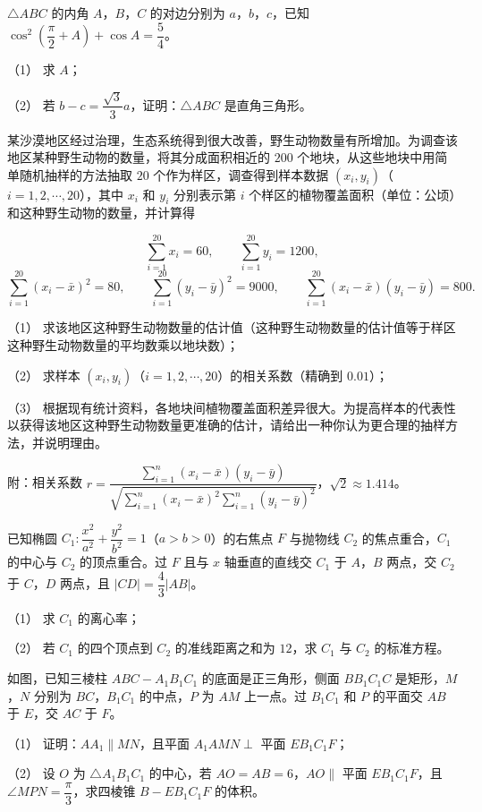 \begin{question}
$\triangle ABC$ 的内角 $A$，$B$，$C$ 的对边分别为 $a$，$b$，$c$，已知 $\cos^2\left(\dfrac\pi2+A\right)+\cos A=\dfrac54$。

（1） 求 $A$；

（2） 若 $b-c=\dfrac{\sqrt3}3a$，证明：$\triangle ABC$ 是直角三角形。

\end{question}
\begin{question}
某沙漠地区经过治理，生态系统得到很大改善，野生动物数量有所增加。为调查该地区某种野生动物的数量，将其分成面积相近的 $200$ 个地块，从这些地块中用简单随机抽样的方法抽取 $20$ 个作为样区，调查得到样本数据 $(x_i,y_i)$（$i=1,2,\cdots,20$），其中 $x_i$ 和 $y_i$ 分别表示第 $i$ 个样区的植物覆盖面积（单位：公顷）和这种野生动物的数量，并计算得

\nopagebreak[4]
\[\sum_{i=1}^{20}x_i=60,\qquad \sum_{i=1}^{20}y_i=1200,\]
\nopagebreak[4]
\[\sum_{i=1}^{20}(x_i-\bar x)^2=80,\qquad \sum_{i=1}^{20}(y_i-\bar y)^2=9000,\qquad \sum_{i=1}^{20}(x_i-\bar x)(y_i-\bar y)=800.\]

（1） 求该地区这种野生动物数量的估计值（这种野生动物数量的估计值等于样区这种野生动物数量的平均数乘以地块数）；

（2） 求样本 $(x_i,y_i)$（$i=1,2,\cdots,20$）的相关系数（精确到 $0.01$）；

（3） 根据现有统计资料，各地块间植物覆盖面积差异很大。为提高样本的代表性以获得该地区这种野生动物数量更准确的估计，请给出一种你认为更合理的抽样方法，并说明理由。

附：相关系数 $r=\dfrac{\sum\limits_{i=1}^n(x_i-\bar x)(y_i-\bar y)}{\sqrt{\sum\limits_{i=1}^n(x_i-\bar x)^2\sum\limits_{i=1}^n(y_i-\bar y)^2}}$，$\sqrt2\approx1.414$。

\end{question}
\begin{question}
已知椭圆 $C_1:\dfrac{x^2}{a^2}+\dfrac{y^2}{b^2}=1$（$a>b>0$）的右焦点 $F$ 与抛物线 $C_2$ 的焦点重合，$C_1$ 的中心与 $C_2$ 的顶点重合。过 $F$ 且与 $x$ 轴垂直的直线交 $C_1$ 于 $A$，$B$ 两点，交 $C_2$ 于 $C$，$D$ 两点，且 $|CD|=\dfrac43|AB|$。

（1） 求 $C_1$ 的离心率；

（2） 若 $C_1$ 的四个顶点到 $C_2$ 的准线距离之和为 $12$，求 $C_1$ 与 $C_2$ 的标准方程。

\Needspace{0.4\textheight}
\end{question}
\begin{question}
如图，已知三棱柱 $ABC-A_1B_1C_1$ 的底面是正三角形，侧面 $BB_1C_1C$ 是矩形，$M$，$N$ 分别为 $BC$，$B_1C_1$ 的中点，$P$ 为 $AM$ 上一点。过 $B_1C_1$ 和 $P$ 的平面交 $AB$ 于 $E$，交 $AC$ 于 $F$。

（1） 证明：$AA_1\parallel MN$，且平面 $A_1AMN\perp$ 平面 $EB_1C_1F$；

（2） 设 $O$ 为 $\triangle A_1B_1C_1$ 的中心，若 $AO=AB=6$，$AO\parallel$ 平面 $EB_1C_1F$，且 $\angle MPN=\dfrac\pi3$，求四棱锥 $B-EB_1C_1F$ 的体积。
\nopagebreak[4]
\begin{center}\end{center}
\nopagebreak[4]
\end{question}

